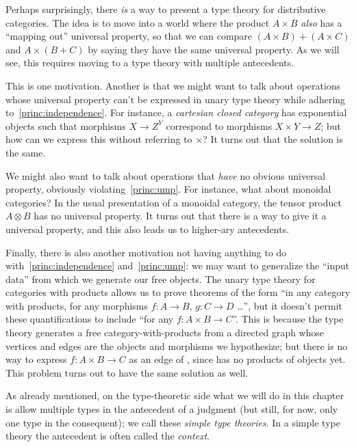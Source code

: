 \documentclass{book}
\begin{document}
Perhaps surprisingly, there \emph{is} a way to present a type theory for distributive categories.
The idea is to move into a world where the product $A\times B$ \emph{also} has a ``mapping out'' universal property, so that we can compare $(A\times B)+(A\times C)$ and $A\times (B+C)$ by saying they have the same universal property.
As we will see, this requires moving to a type theory with multiple antecedents.

This is one motivation.
Another is that we might want to talk about operations whose universal property can't be expressed in unary type theory while adhering to~\eqref{princ:independence}.
For instance, a \emph{cartesian closed category} has exponential objects such that morphisms $X\to Z^Y$ correspond to morphisms $X\times Y\to Z$; but how can we express this without referring to $\times$?
It turns out that the solution is the same.

We might also want to talk about operations that \emph{have} no obvious universal property, obviously violating~\eqref{princ:ump}.
For instance, what about monoidal categories?
In the usual presentation of a monoidal category, the tensor product $A\otimes B$ has no universal property.
It turns out that there is a way to give it a universal property, and this also leads us to higher-ary antecedents.

Finally, there is also another motivation not having anything to do with~\eqref{princ:independence} and~\eqref{princ:ump}: we may want to generalize the ``input data'' \cG from which we generate our free objects.
The unary type theory for categories with products allows us to prove theorems of the form ``in any category with products, for any morphisms $f:A\to B$, $g:C\to D$ \dots'', but it doesn't permit these quantifications to include ``for any $f:A\times B\to C$''.
This is because the type theory generates a free category-with-products from a directed graph \cG whose vertices and edges are the objects and morphisms we hypothesize; but there is no way to express $f:A\times B\to C$ as an edge of \cG, since \cG has no products of objects yet.
This problem turns out to have the same solution as well.

As already mentioned, on the type-theoretic side what we will do in this chapter is allow multiple types in the antecedent of a judgment (but still, for now, only one type in the consequent); we call these \emph{simple type theories}.
In a simple type theory the antecedent is often called the \emph{context}.
\end{document}

